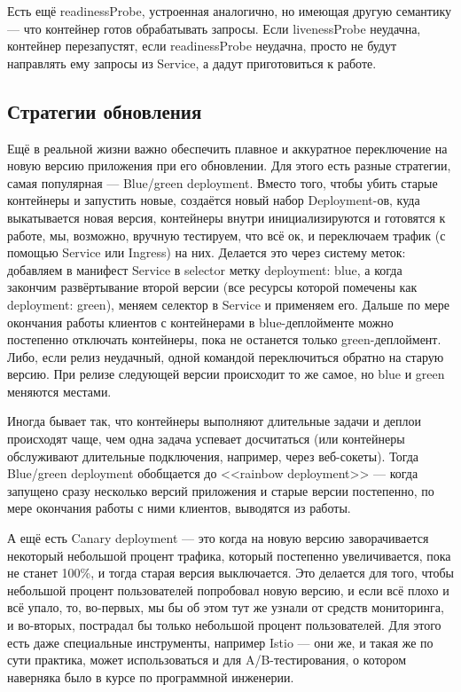 \documentclass[a5paper]{article}
\begin{document}
Есть ещё readinessProbe, устроенная аналогично, но имеющая другую семантику --- что контейнер готов обрабатывать запросы. Если livenessProbe неудачна, контейнер перезапустят, если readinessProbe неудачна, просто не будут направлять ему запросы из Service, а дадут приготовиться к работе.

\subsection{Стратегии обновления}

Ещё в реальной жизни важно обеспечить плавное и аккуратное переключение на новую версию приложения при его обновлении. Для этого есть разные стратегии, самая популярная --- Blue/green deployment. Вместо того, чтобы убить старые контейнеры и запустить новые, создаётся новый набор Deployment-ов, куда выкатывается новая версия, контейнеры внутри инициализируются и готовятся к работе, мы, возможно, вручную тестируем, что всё ок, и переключаем трафик (с помощью Service или Ingress) на них. Делается это через систему меток: добавляем в манифест Service в selector метку deployment: blue, а когда закончим развёртывание второй версии (все ресурсы которой помечены как deployment: green), меняем селектор в Service и применяем его. Дальше по мере окончания работы клиентов с контейнерами в blue-деплойменте можно постепенно отключать контейнеры, пока не останется только green-деплоймент. Либо, если релиз неудачный, одной командой переключиться обратно на старую версию. При релизе следующей версии происходит то же самое, но blue и green меняются местами.

Иногда бывает так, что контейнеры выполняют длительные задачи и деплои происходят чаще, чем одна задача успевает досчитаться (или контейнеры обслуживают длительные подключения, например, через веб-сокеты). Тогда Blue/green deployment обобщается до <<rainbow deployment>> --- когда запущено сразу несколько версий приложения и старые версии постепенно, по мере окончания работы с ними клиентов, выводятся из работы.

А ещё есть Canary deployment --- это когда на новую версию заворачивается некоторый небольшой процент трафика, который постепенно увеличивается, пока не станет 100\%, и тогда старая версия выключается. Это делается для того, чтобы небольшой процент пользователей попробовал новую версию, и если всё плохо и всё упало, то, во-первых, мы бы об этом тут же узнали от средств мониторинга, и во-вторых, пострадал бы только небольшой процент пользователей. Для этого есть даже специальные инструменты, например Istio --- они же, и такая же по сути практика, может использоваться и для A/B-тестирования, о котором наверняка было в курсе по программной инженерии.
\end{document}
